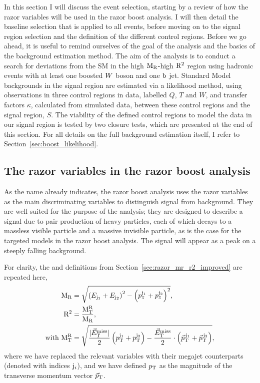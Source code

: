 In this section I will discuss the event selection, starting by a review of 
how the razor variables will be used in the razor boost analysis. I will then detail the
baseline selection that is applied to all events, before moving on to the signal region selection
and the definition of the different control regions. 
Before we go ahead, it is useful to remind ourselves of the goal of the analysis and the basics
of the background estimation method. 
The aim of the analysis is to conduct a search for deviations from the SM in the high $\mathrm{M_R}$-high
$\mathrm{R^2}$ region using hadronic events with at least one boosted $W$ boson and one $\mathrm{b}$ jet.
Standard Model backgrounds in the signal region are estimated via a likelihood method, using
observations in three control regions in data, labelled $Q$, $T$ and $W$, and transfer factors
$\kappa$, calculated from simulated data, between these control regions and the signal region,
$S$. 
The viability of the defined control regions to model the data in our signal region is tested by
two closure tests, which are presented at the end of this section.
For all details on the full background estimation itself, I refer to
Section~\ref{sec:boost_likelihood}. 

\subsection{The razor variables in the razor boost analysis \label{sec:boost_event_razor}}

As the name already indicates, the razor boost analysis uses the razor variables as the main
discriminating variables to distinguish signal from background. They are well suited for the purpose
of the analysis; they are
designed to describe a signal due to pair production of heavy particles, each of which decays to a
massless visible particle and a massive invisible particle, as is the case for the targeted models
in the razor boost analysis. The signal will appear as a peak on a steeply falling background. 

For clarity, the \mr and \rsq definitions from Section~\ref{sec:razor_mr_r2_improved} are repeated
here,  
\begin{align}
  \mathrm{M_R} &= \sqrt{\left( E_{{\rm j}_1} + E_{{\rm j}_2}\right)^2 - \left( p_{z}^{{\rm j}_1} +
p_{z}^{{\rm j}_2} \right)^2} ,\\
  \mathrm{R^2} &= \frac{\mathrm{M_T^R}}{\mathrm{M_R}} ,\\
  \textrm{with } \mathrm{M_T^R} &= \sqrt{\frac{|{\vec E}_{\mathrm{T}}^{\text{miss}}|}{2} \left(p_{\mathrm{T}}^{{\rm j}_1} + p_{\mathrm{T}}^{{\rm j}_2}
\right) - \frac{{\vec E}_{\mathrm{T}}^{\text{miss}}}{2} \cdot \left({\vec p}_{\mathrm{T}}^{\,{\rm j}_1} + {\vec p}_{\mathrm{T}}^{\,{\rm j}_2}
\right)} ,
\end{align}
where we have replaced the relevant variables with their megajet counterparts (denoted with indices
${\rm j}_i$), and we have defined $p_{\mathrm{T}}$ as the magnitude of the transverse momentum vector
${\vec p}_{\mathrm{T}}$. 

